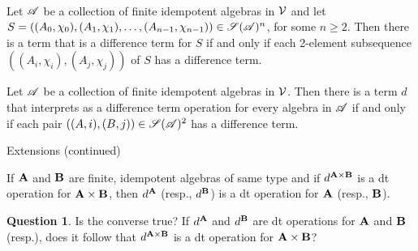 \documentclass[notes=hide,12pt,xcolor=dvipsnames%
   ]{beamer}
\theoremstyle{definition}
\newtheorem{question}{Question}
\begin{document}
\begin{frame}[label=extensions]{~}

\begin{theorem}
  \label{thm:glob-loc-diff-terms}
  Let $\mathscr{A}$ be a collection of finite idempotent
  algebras in $\mathcal{V}$ and let
  $S= ((A_0, \chi_0), (A_1, \chi_1), \dots, (A_{n-1}, \chi_{n-1}))\in \mathscr{S}(\mathscr{A})^n$,
  for some $n\geq 2$.
  Then there is a term that is a \glocal difference term for $S$
  if and only if each 2-element subsequence $((A_i,\chi_i), (A_j,\chi_j))$ of $S$
  has a \glocal difference term.
\end{theorem}
\pause

\begin{corollary}
  \label{cor:glob-loc-diff-term}
  Let $\mathscr{A}$ be a collection of finite idempotent
  algebras in $\mathcal{V}$. %
  Then there is a term $d$ that interprets as a difference term operation
  for every algebra in $\mathscr{A}$
  if and only if each pair $((A,i), (B,j)) \in \mathscr{S}(\mathscr{A})^2$ has a \glocal
  difference term.
\end{corollary}

\end{frame}


\begin{frame}[label=extensions]{Extensions (continued)}

\begin{lemma}
  \label{lem:products}
  If $\mathbf{A}$ and $\mathbf{B}$ are finite, idempotent algebras of same type
  and if $d^{\mathbf{A} \times \mathbf{B}}$ is a dt operation for $\mathbf{A}\times \mathbf{B}$,
  then $d^{\mathbf{A}}$ (resp., $d^{\mathbf{B}}$) is a dt operation for 
  $\mathbf{A}$  (resp., $\mathbf{B}$).
\end{lemma}

\pause
\begin{question}
  Is the converse true? 
  If $d^{\mathbf{A}}$ and $d^{\mathbf{B}}$ are dt operations for 
  $\mathbf{A}$ and $\mathbf{B}$ (resp.), does it follow that $d^{\mathbf{A} \times \mathbf{B}}$
  is a dt operation for $\mathbf{A} \times \mathbf{B}$?
\end{question}
\end{frame}
\end{document}
